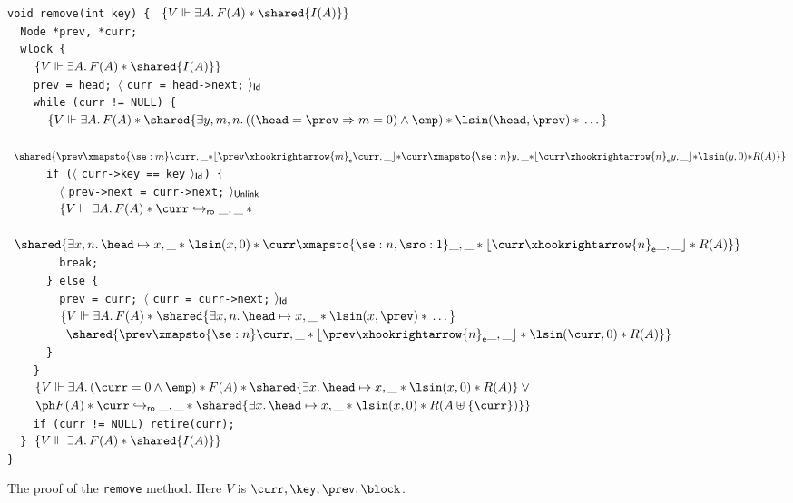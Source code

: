 \begin{figure}[t]
\verb|void remove(int key) { |%
\textcolor{blue}{$\{V \Vdash \exists A.\,F(A)*\shared{I(A)}\}$}\\
\verb|  Node *prev, *curr;|\\
\verb|  wlock {|\\
\verb|    |\textcolor{blue}{$\{V \Vdash \exists A.\,F(A)*\shared{I(A)}\}$}\\
\verb|    prev = head; |$\langle$ \verb|curr = head->next;| $\rangle_{\sf Id}$\\
\verb|    while (curr != NULL) {|\\
\verb|      |\textcolor{blue}{$\{V \Vdash \exists A.\,F(A)*\shared{
\exists y,m,n.\, ((\head = \prev \Rightarrow m=0) \wedge \emp)*
\lsin(\head, \prev) * {} \ldots\,}$}\\
\verb|      |\textcolor{blue}{$\phantom{\{}\shared{
\prev \xmapsto{\se:m} \curr,\_ {*} \lfloor \prev \xhookrightarrow{m}_{\sf e} \curr,\_\rfloor{*}
\curr \xmapsto{\se:n} y,\_ {*} \lfloor \curr \xhookrightarrow{n}_{\sf e} y,\_\rfloor
{*} \lsin(y, 0) {*} R(A)}\}$}\\
\verb|      if (|$\langle$ \verb|curr->key == key| $\rangle_{\sf Id}$\verb|) {|\\
\verb|        |$\langle$ \verb|prev->next = curr->next;| $\rangle _{\sf Unlink}$\\
\verb|        |\textcolor{blue}{$\{V \Vdash \exists A.\,F(A)*\curr
  \hookrightarrow_{\sf ro} \_,\_*{}$}\\ 
\verb|        |\textcolor{blue}{$\phantom{\{}\shared{\exists x, n.\, \head
    \mapsto x,\_ * \lsin(x, 0) *  
\curr \xmapsto{\se:n,\sro:1} \_,\_ * 
\lfloor \curr \xhookrightarrow{n}_{\sf e} \_,\_ \rfloor*R(A)}\}$}\\
\verb|        break;|\\
\verb|      } else {|\\
\verb|        prev = curr; |$\langle$ \verb|curr = curr->next;| $\rangle_{\sf Id}$\\
\verb|        |\textcolor{blue}{$\{V \Vdash \exists A.\,F(A)*
\shared{\exists x,n.\, \head \mapsto x,\_ * \lsin(x, \prev) * {}\ldots \,}$}\\
\verb|        |\textcolor{blue}{$\phantom{\{}
\shared{\prev
  \xmapsto{\se:n} \curr,\_ * \lfloor \prev \xhookrightarrow{n}_{\sf e} \_,\_
\rfloor * \lsin(\curr, 0) * R(A)}\}$}\\
\verb|      }|\\
\verb|    }|\\
\verb|    |\textcolor{blue}{$\{V \Vdash \exists A.\, (\curr = 0 \wedge \emp) * F(A)*
\shared{\exists x.\, \head \mapsto x,\_ * \lsin(x, 0) * R(A)} \vee  {}$}\\
\verb|    |\textcolor{blue}{$\ph 
F(A)*\curr \hookrightarrow_{\sf ro} \_,\_*\shared{\exists x.\, \head \mapsto x,\_ * \lsin(x, 0) * 
R(A\uplus \{\curr\})}
\}$}\\
\verb|    if (curr != NULL) retire(curr);|\\
\verb|  } |\textcolor{blue}{$\{V \Vdash \exists A.\,F(A)*\shared{I(A)}\}$}\\
\verb|}|
\caption{The proof of the {\tt remove} method. Here $V$ is $\curr, \key, \prev, \block$.}
\label{fig:remove}
\end{figure}
